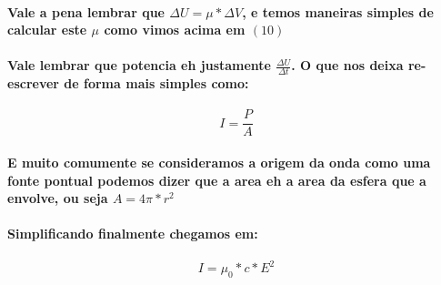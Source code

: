 \documentclass[12pt,twoside, a4paper, twocolumn]{article}
\begin{document}
\paragraph*{Vale a pena lembrar que $\Delta{U} = \mu * \Delta{V}$, e temos maneiras simples de calcular este $\mu$ como vimos acima em $(10)$}
\paragraph*{Vale lembrar que potencia eh justamente $\frac{\Delta{U}}{\Delta{t}}$. O que nos deixa re-escrever de forma mais simples como:}
\begin{equation}
    I = \frac{P}{A}
\end{equation}
\paragraph*{E muito comumente se consideramos a origem da onda como uma fonte pontual podemos dizer que a area eh a area da esfera que a envolve, ou seja $A = 4\pi * r^2$}
\paragraph*{Simplificando finalmente chegamos em:}
\begin{equation}
    I = \mu_0 * c * E^2
\end{equation}
\end{document}
